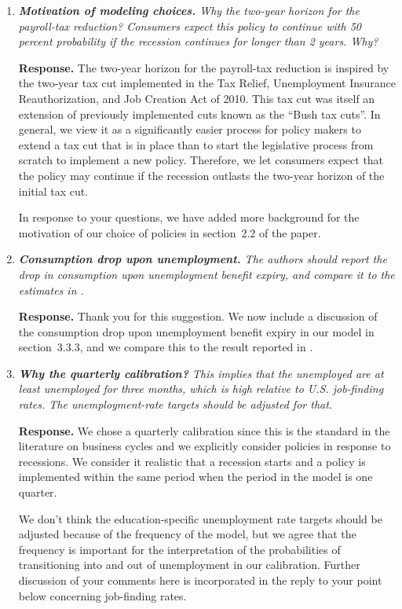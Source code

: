 \documentclass[12pt,letterpaper,english]{article}
\begin{document}
\begin{enumerate}
\begin{enumerate}
		\item \textit{\textbf{Motivation of modeling choices.} Why the two-year horizon for the payroll-tax	reduction? Consumers expect this policy to continue with 50 percent	probability if the recession continues for longer than 2 years. Why?}

		\noindent \textbf{Response.} The two-year horizon for the payroll-tax reduction is inspired by the two-year tax cut implemented in the Tax Relief, Unemployment Insurance Reauthorization, and Job Creation Act of 2010. This tax cut was itself an extension of previously implemented cuts known as the ``Bush tax cuts''. In general, we view it as a significantly easier process for policy makers to extend a tax cut that is in place than to start the legislative process from scratch to implement a new policy. Therefore, we let consumers expect that the policy may continue if the recession outlasts the two-year horizon of the initial tax cut.
		
		In response to your questions, we have added more background for the motivation of our choice of policies in section~2.2 of the paper.  

		\item \textit{\textbf{Consumption drop upon unemployment.} The authors should report the drop in consumption upon unemployment benefit expiry, and compare it to the estimates in \citet{ganongconsumer2019}.}

		\noindent \textbf{Response.} Thank you for this suggestion. We now include a discussion of the consumption drop upon unemployment benefit expiry in our model in section~3.3.3, and we compare this to the result reported in \citet{ganongconsumer2019}. 
	
		\item \textit{\textbf{Why the quarterly calibration?} This implies that the unemployed are at least unemployed for three months, which is high relative to U.S. job-finding rates. The unemployment-rate targets should be adjusted for that.}

		\noindent \textbf{Response.} We chose a quarterly calibration since this is the standard in the literature on business cycles and we explicitly consider policies in response to recessions. We consider it realistic that a recession starts and a policy is implemented within the same period when the period in the model is one quarter.
		
		We don't think the education-specific unemployment rate targets should be adjusted because of the frequency of the model, but we agree that the frequency is important for the interpretation of the probabilities of transitioning into and out of unemployment in our calibration. Further discussion of your comments here is incorporated in the reply to your point below concerning job-finding rates. 
		

\end{enumerate}
\end{enumerate}
\end{document}
